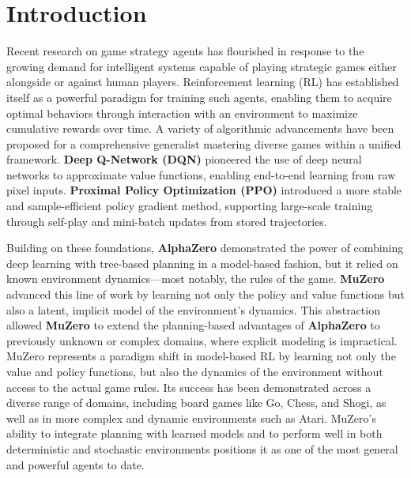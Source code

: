 \section{Introduction}
Recent research on game strategy agents has flourished in response to the growing demand for intelligent systems capable 
of playing strategic games either alongside or against human players. 
Reinforcement learning (RL) has established itself as a powerful paradigm for training such agents, enabling them to acquire 
optimal behaviors through interaction with an environment to maximize cumulative rewards over time.
A variety of algorithmic advancements have been proposed for a comprehensive generalist mastering diverse games within a unified framework. 
\textbf{Deep Q-Network (DQN)} \cite{mnih2013playingatarideepreinforcement} pioneered the use of deep neural networks to approximate value 
functions, enabling end-to-end learning from raw pixel inputs. 
\textbf{Proximal Policy Optimization (PPO)} \cite{schulman2017proximalpolicyoptimizationalgorithms} introduced a more stable and 
sample-efficient policy gradient method, supporting large-scale training through self-play and mini-batch updates from stored trajectories.

Building on these foundations, \textbf{AlphaZero} \cite{silver2017masteringchessshogiselfplay} demonstrated the power of combining deep 
learning with tree-based planning in a model-based fashion, but it relied on known environment dynamics—most notably, the rules of the game. 
\textbf{MuZero} \cite{Schrittwieser2020} advanced this line of work by learning not only the policy and value functions but also a latent, 
implicit model of the environment’s dynamics. 
This abstraction allowed \textbf{MuZero} to extend the planning-based advantages of \textbf{AlphaZero} to previously unknown or complex 
domains, where explicit modeling is impractical. 
MuZero represents a paradigm shift in model-based RL by learning not only the value and policy functions, but also the dynamics of the 
environment without access to the actual game rules. Its success has been demonstrated across a diverse range of domains, including board 
games like Go, Chess, and Shogi, as well as in more complex and dynamic environments such as Atari. 
MuZero’s ability to integrate planning with learned models and to perform well in both deterministic and stochastic environments positions 
it as one of the most general and powerful agents to date.

